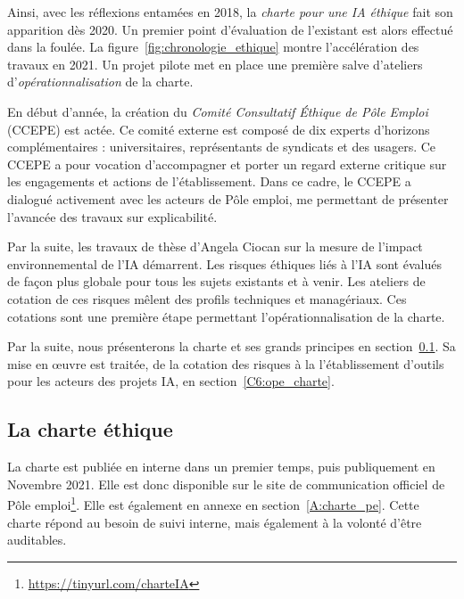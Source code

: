 Ainsi, avec les réflexions entamées en 2018, la \textit{charte pour une IA éthique} fait son apparition dès 2020. Un premier point d'évaluation de l'existant est alors effectué dans la foulée.
La figure~\ref{fig:chronologie_ethique} montre l'accélération des travaux en 2021.
Un projet pilote met en place une première salve d'ateliers d'\textit{opérationnalisation} de la charte.

En début d'année, la création du \textit{Comité Consultatif \'Ethique de Pôle Emploi} (CCEPE) est actée. Ce comité externe est composé de dix experts d'horizons complémentaires : universitaires, représentants de syndicats et des usagers. Ce CCEPE a pour vocation d'accompagner et porter un regard externe critique sur les engagements et actions de l'établissement. Dans ce cadre, le CCEPE a dialogué activement avec les acteurs de Pôle emploi, me permettant de présenter l'avancée des travaux sur explicabilité.

Par la suite, les travaux de thèse d'Angela Ciocan sur la mesure de l'impact environnemental de l'IA démarrent.
Les risques éthiques liés à l'IA sont évalués de façon plus globale pour tous les sujets existants et à venir. Les ateliers de cotation de ces risques mêlent des profils techniques et managériaux. Ces cotations sont une première étape permettant l'opérationnalisation de la charte.

Par la suite, nous présenterons la charte et ses grands principes en section~\ref{C6:charte}. Sa mise en œuvre est traitée, de la cotation des risques à la l'établissement d'outils pour les acteurs des projets IA, en section~\ref{C6:ope_charte}.

\subsection{La charte éthique} \label{C6:charte}

La charte est publiée en interne dans un premier temps, puis publiquement en Novembre 2021. Elle est donc disponible sur le site de communication officiel de Pôle emploi\footnote{\url{https://tinyurl.com/charteIA}}. Elle est également en annexe en section~\ref{A:charte_pe}.
Cette charte répond au besoin de suivi interne, mais également à la volonté d'être auditables.

